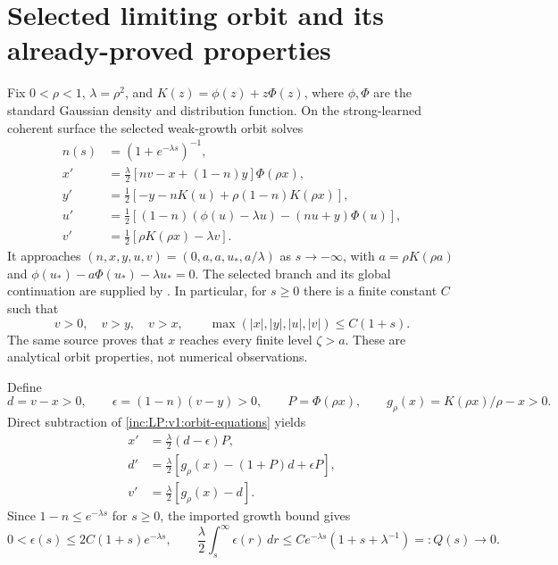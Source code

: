 \documentclass[11pt]{article}
\numberwithin{equation}{section}
\theoremstyle{remark}\newtheorem{remark}[theorem]{Remark}
\newcommand{\dd}{\,d}
\begin{document}
\section{Selected limiting orbit and its already-proved properties}
\label{inc:LP:v1:orbit}
Fix $0<\rho<1$, $\lambda=\rho^2$, and
$K(z)=\phi(z)+z\Phi(z)$, where $\phi,\Phi$ are the standard Gaussian density
and distribution function. On the strong-learned coherent surface the
selected weak-growth orbit solves
\begin{align}
 n(s)&=(1+e^{-\lambda s})^{-1},\nonumber\\
 x'&=\frac\lambda2[nv-x+(1-n)y]\Phi(\rho x),\nonumber\\
 y'&=\frac12[-y-nK(u)+\rho(1-n)K(\rho x)],\nonumber\\
 u'&=\frac12[(1-n)(\phi(u)-\lambda u)-(nu+y)\Phi(u)],\nonumber\\
 v'&=\frac12[\rho K(\rho x)-\lambda v].
 \label{inc:LP:v1:orbit-equations}
\end{align}
It approaches $(n,x,y,u,v)=(0,a,a,u_*,a/\lambda)$ as $s\to-\infty$, with
$a=\rho K(\rho a)$ and
$\phi(u_*)-a\Phi(u_*)-\lambda u_*=0$.
The selected branch and its global continuation are supplied by \cite{P}.
In particular, for $s\ge0$ there is a finite constant $C$ such that
\begin{equation}\label{inc:LP:v1:imports}
 v>0,\quad v>y,\quad v>x,\qquad
 \max(|x|,|y|,|u|,|v|)\le C(1+s).
\end{equation}
The same source proves that $x$ reaches every finite level $\zeta>a$.
These are analytical orbit properties, not numerical observations.

Define
\[
 d=v-x>0,\qquad \epsilon=(1-n)(v-y)>0,\qquad
 P=\Phi(\rho x),\qquad
 g_\rho(x)=K(\rho x)/\rho-x>0.
\]
Direct subtraction of \eqref{inc:LP:v1:orbit-equations} yields
\begin{align}
 x'&=\frac\lambda2(d-\epsilon)P,\label{inc:LP:v1:x-equation}\\
 d'&=\frac\lambda2[g_\rho(x)-(1+P)d+\epsilon P],
 \label{inc:LP:v1:d-equation}\\
 v'&=\frac\lambda2[g_\rho(x)-d].\label{inc:LP:v1:v-equation}
\end{align}
Since $1-n\le e^{-\lambda s}$ for $s\ge0$, the imported growth bound gives
\begin{equation}\label{inc:LP:v1:epsilon-tail}
 0<\epsilon(s)\le2C(1+s)e^{-\lambda s},\qquad
 \frac\lambda2\int_s^\infty\epsilon(r)\dd r
 \le C e^{-\lambda s}(1+s+\lambda^{-1})=:Q(s)\longrightarrow0.
\end{equation}
\end{document}
